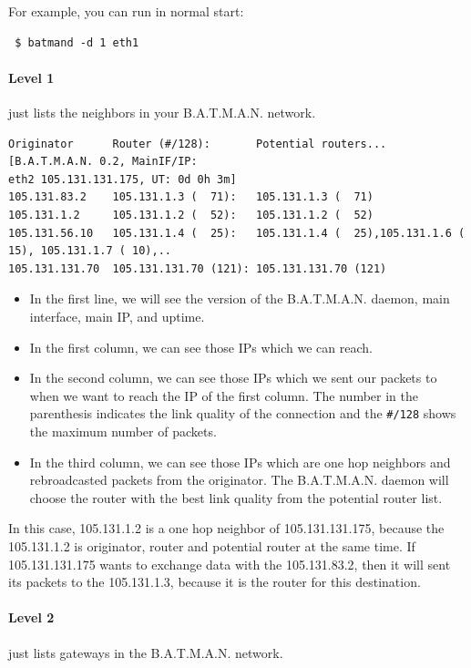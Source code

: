 \documentclass[
	12pt,
	a4paper,
	twoside,
	english,
	headsepline,
	footnosepline,
	automark,
	normalheadings,
	openany,
	cleardoubleplain,
	abstracton,
	idxtotoc,
	liststotoc,
	bibtotoc,
 	BCOR8mm,
]{scrartcl}
\begin{document}
For example, you can run in normal start:
\begin{verbatim}
 $ batmand -d 1 eth1
\end{verbatim}

\paragraph*{Level 1}
just lists the neighbors in your B.A.T.M.A.N. network.

\begin{lstlisting}[basicstyle=\footnotesize,	frame=single, columns= flexible]
Originator      Router (#/128):       Potential routers... [B.A.T.M.A.N. 0.2, MainIF/IP:
eth2 105.131.131.175, UT: 0d 0h 3m]
105.131.83.2    105.131.1.3 (  71):   105.131.1.3 (  71)
105.131.1.2     105.131.1.2 (  52):   105.131.1.2 (  52)
105.131.56.10   105.131.1.4 (  25):   105.131.1.4 (  25),105.131.1.6 ( 15), 105.131.1.7 ( 10),..
105.131.131.70  105.131.131.70 (121): 105.131.131.70 (121)
\end{lstlisting}

\begin{itemize}
\item In the first line, we will see the version of the B.A.T.M.A.N. daemon,
      main interface, main IP, and uptime.
\item In the first column, we can see those IPs which we can reach.
\item In the second column, we can see those IPs which we sent our packets to
      when we want to reach the IP of the first column. The number in the
      parenthesis indicates the link quality of the connection and the
      \verb|#/128| shows the maximum number of packets.
\item In the third column, we can see those IPs which are one hop neighbors and
      rebroadcasted packets from the originator. The B.A.T.M.A.N. daemon will
      choose the router with the best link quality from the potential router
      list.
\end{itemize}

In this case, 105.131.1.2 is a one hop neighbor of 105.131.131.175, because the
105.131.1.2 is originator, router and potential router at the same time. If
105.131.131.175 wants to exchange data with the 105.131.83.2, then it will sent
its packets to the 105.131.1.3, because it is the router for this destination.

\paragraph*{Level 2}
just lists gateways in the B.A.T.M.A.N. network.
\end{document}
